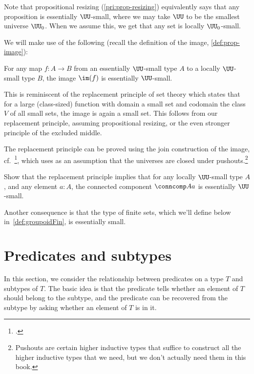 \begin{remark}
  Note that propositional resizing (\cref{pri:prop-resizing})
  equivalently says that any proposition is essentially $\UU$-small,
  where we may take $\UU$ to be the smallest universe $\UU_0$.
  When we assume this, we get that any set is locally $\UU_0$-small.
\end{remark}

We will make use of the following (recall the definition of the image, \cref{def:prop-image}):
\begin{principle}[Replacement]
  \label{pri:replacement}
  For any map $f : A \to B$
  from an essentially $\UU$-small type $A$
  to a locally $\UU$-small type $B$,
  the image $\im(f)$ is essentially $\UU$-small.
\end{principle}
This is reminiscent of the replacement principle of set theory which states
that for a large (class-sized) function with domain a small set
and codomain the class $V$ of all small sets,
the image is again a small set.
This follows from our replacement principle,
assuming propositional resizing, or the even stronger principle of the excluded middle.

The replacement principle can be proved using the join construction of the image, cf.~\citeauthor{Rijke-Join}\footcite{Rijke-Join},
which uses as an assumption that the universes
are closed under pushouts.\footnote{%
  Pushouts are certain higher inductive types that suffice
  to construct all the higher inductive types that we need,
  but we don't actually need them in this book.}
\begin{xca}\label{xca:comp-loc-small-ess-small}
  Show that the replacement principle implies that for any locally $\UU$-small type $A$,
  and any element $a:A$,
  the connected component $\conncomp A a$ is essentially $\UU$-small.
\end{xca}
Another consequence is that the type of finite sets, which we'll define below
in~\cref{def:groupoidFin}, is essentially small.


\section{Predicates and subtypes}
\label{sec:subtype}

In this section, we consider the relationship between predicates on a type $T$ and subtypes of $T$.  The basic idea is that the predicate tells
whether an element of $T$ should belong to the subtype, and the predicate can be recovered from the subtype by asking whether an element of $T$
is in it.

